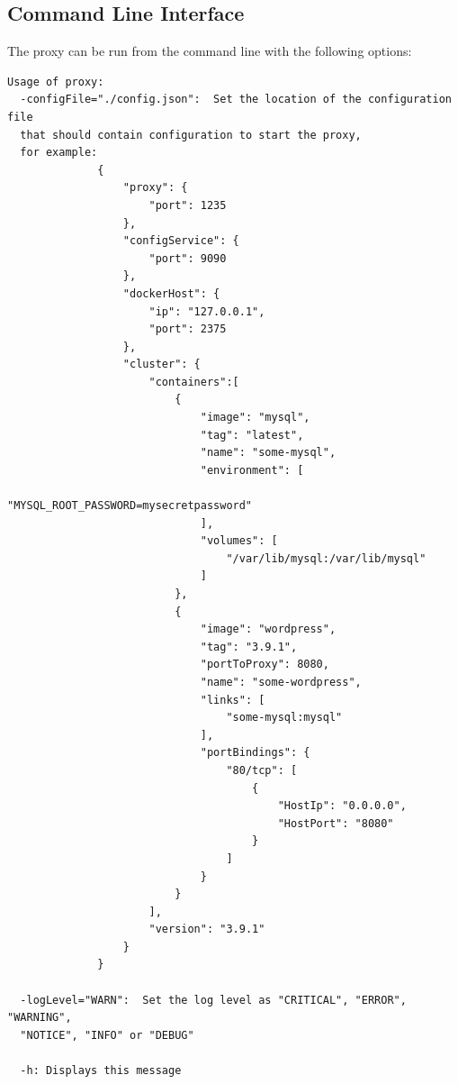 \documentclass[a4paper,11pt,twoside]{report}
\begin{document}
\begin{appendices}
\subsection*{Command Line Interface}
The proxy can be run from the command line with the following options:\bigskip

\begin{lstlisting}[language=terminal]
Usage of proxy:
  -configFile="./config.json":  Set the location of the configuration file 
  that should contain configuration to start the proxy, 
  for example:
              {
                  "proxy": {
                      "port": 1235
                  },
                  "configService": {
                      "port": 9090
                  },
                  "dockerHost": {
                      "ip": "127.0.0.1",
                      "port": 2375
                  },
                  "cluster": {
                      "containers":[
                          {
                              "image": "mysql",
                              "tag": "latest",
                              "name": "some-mysql",
                              "environment": [
                                  "MYSQL_ROOT_PASSWORD=mysecretpassword"
                              ],
                              "volumes": [
                                  "/var/lib/mysql:/var/lib/mysql"
                              ]
                          },
                          {
                              "image": "wordpress",
                              "tag": "3.9.1",
                              "portToProxy": 8080,
                              "name": "some-wordpress",
                              "links": [
                                  "some-mysql:mysql"
                              ],
                              "portBindings": {
                                  "80/tcp": [
                                      {
                                          "HostIp": "0.0.0.0",
                                          "HostPort": "8080"
                                      }
                                  ]
                              }
                          }
                      ],
                      "version": "3.9.1"
                  }
              }

  -logLevel="WARN":  Set the log level as "CRITICAL", "ERROR", "WARNING", 
  "NOTICE", "INFO" or "DEBUG"

  -h: Displays this message
\end{lstlisting} 


\end{appendices}
\end{document}
